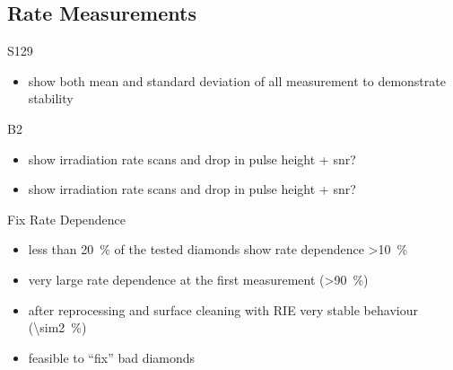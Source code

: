 \subsection{Rate Measurements}
\begin{frame}{S129}

	
	\begin{itemize}\itemfill
		\item show both mean and standard deviation of all measurement to demonstrate stability
	\end{itemize}

\end{frame}
\begin{frame}{B2}

	
	\begin{itemize}\itemfill
		\item show irradiation rate scans and drop in pulse height + snr?
	\end{itemize}

\end{frame}
\begin{frame}{97}

	
	\begin{itemize}\itemfill
		\item show irradiation rate scans and drop in pulse height + snr?
	\end{itemize}

\end{frame}
\begin{frame}{Fix Rate Dependence}

	
	\begin{itemize}\itemfill
		\item less than \SI{20}{\%} of the tested diamonds show rate dependence \SI{>10}{\%}
		\item very large rate dependence at the first measurement (\SI{>90}{\%})
		\item after reprocessing and surface cleaning with RIE very stable behaviour (\SI{\sim2}{\%})
		\item feasible to ``fix'' bad diamonds
	\end{itemize}

\end{frame}
